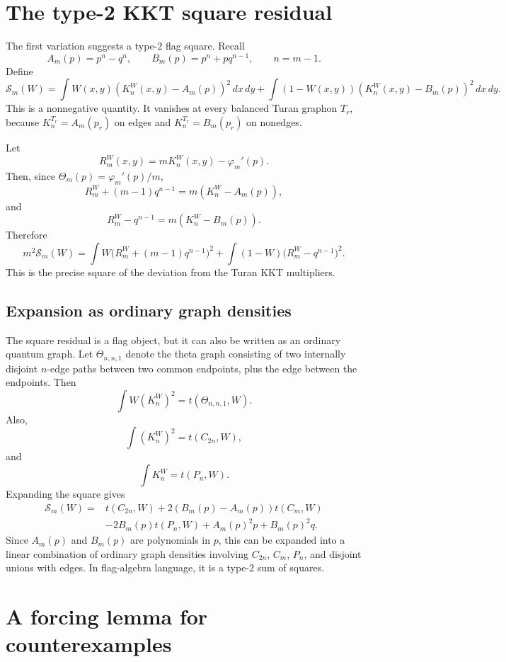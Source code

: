 \documentclass[11pt]{article}
\theoremstyle{definition}
\newcommand{\dd}{\,d}
\begin{document}
\section{The type-2 KKT square residual}

The first variation suggests a type-2 flag square.  Recall
\[
        A_m(p)=p^n-q^n,
        \qquad
        B_m(p)=p^n+pq^{n-1},
        \qquad n=m-1.
\]
Define
\[
\boxed{
        \mathcal S_m(W)=
        \int W(x,y)(K_n^W(x,y)-A_m(p))^2\dd x\dd y
        +\int (1-W(x,y))(K_n^W(x,y)-B_m(p))^2\dd x\dd y.
        }
\]
This is a nonnegative quantity.  It vanishes at every balanced Turan graphon $T_r$, because $K_n^{T_r}=A_m(p_r)$ on edges and $K_n^{T_r}=B_m(p_r)$ on nonedges.

Let
\[
        R_m^W(x,y)=mK_n^W(x,y)-\varphi_m'(p).
\]
Then, since $\Theta_m(p)=\varphi_m'(p)/m$,
\[
        R_m^W+(m-1)q^{n-1}=m(K_n^W-A_m(p)),
\]
and
\[
        R_m^W-q^{n-1}=m(K_n^W-B_m(p)).
\]
Therefore
\[
\boxed{
        m^2\mathcal S_m(W)=
        \int W\bigl(R_m^W+(m-1)q^{n-1}\bigr)^2
        +\int(1-W)\bigl(R_m^W-q^{n-1}\bigr)^2.
        }
\]
This is the precise square of the deviation from the Turan KKT multipliers.

\subsection{Expansion as ordinary graph densities}

The square residual is a flag object, but it can also be written as an ordinary quantum graph.  Let $\Theta_{n,n,1}$ denote the theta graph consisting of two internally disjoint $n$-edge paths between two common endpoints, plus the edge between the endpoints.  Then
\[
        \int W(K_n^W)^2=t(\Theta_{n,n,1},W).
\]
Also,
\[
        \int (K_n^W)^2=t(C_{2n},W),
\]
and
\[
        \int K_n^W=t(P_n,W).
\]
Expanding the square gives
\[
\begin{aligned}
        \mathcal S_m(W)
        ={}&t(C_{2n},W)
        +2(B_m(p)-A_m(p))t(C_m,W)\\
        &-2B_m(p)t(P_n,W)
        +A_m(p)^2p+B_m(p)^2q.
\end{aligned}
\]
Since $A_m(p)$ and $B_m(p)$ are polynomials in $p$, this can be expanded into a linear combination of ordinary graph densities involving $C_{2n}$, $C_m$, $P_n$, and disjoint unions with edges.  In flag-algebra language, it is a type-2 sum of squares.

\section{A forcing lemma for counterexamples}
\end{document}
